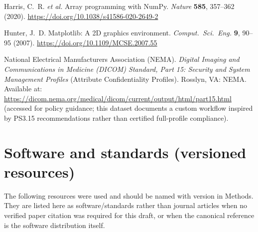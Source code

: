 \documentclass[11pt,letterpaper]{article}
\begin{document}
\begin{enumerate}[leftmargin=*,itemsep=0.65em,label={[\arabic*]}]
  \item \label{ref:numpy}
  Harris, C.~R. \textit{et al.}
  Array programming with NumPy.
  \textit{Nature} \textbf{585}, 357--362 (2020).
  \url{https://doi.org/10.1038/s41586-020-2649-2}

  \item \label{ref:matplotlib}
  Hunter, J.~D.
  Matplotlib: A 2D graphics environment.
  \textit{Comput.\ Sci.\ Eng.} \textbf{9}, 90--95 (2007).
  \url{https://doi.org/10.1109/MCSE.2007.55}

  \item \label{ref:dicomps315}
  National Electrical Manufacturers Association (NEMA).
  \textit{Digital Imaging and Communications in Medicine (DICOM) Standard,
  Part 15: Security and System Management Profiles}
  (Attribute Confidentiality Profiles).
  Rosslyn, VA: NEMA.
  Available at:
  \url{https://dicom.nema.org/medical/dicom/current/output/html/part15.html}
  (accessed for policy guidance; this dataset documents a custom workflow
  inspired by PS3.15 recommendations rather than certified full-profile
  compliance).

\end{enumerate}

\section{Software and standards (versioned resources)}

The following resources were used and should be named with version in Methods.
They are listed here as software/standards rather than journal articles when no
verified paper citation was required for this draft, or when the canonical
reference is the software distribution itself.
\end{document}
